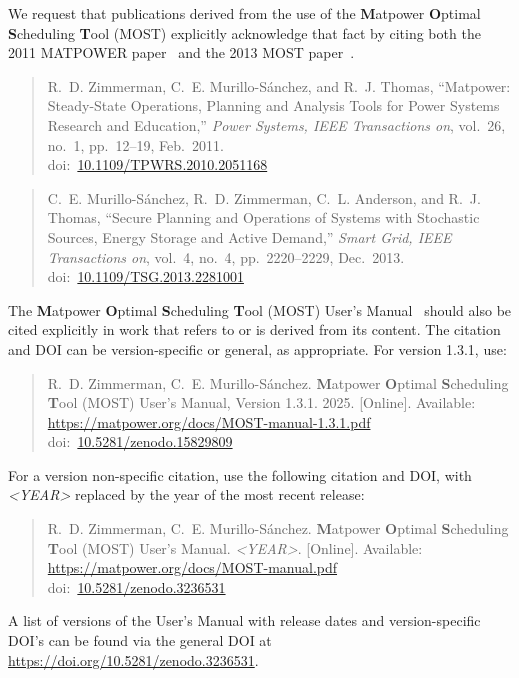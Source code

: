\documentclass[12pt]{article}
\newcommand{\matpower}[0]{{\sc Matpower}}
\newcommand{\most}[0]{{MOST}}
\newcommand{\mostname}[0]{{{\bf M}{\sc atpower} \textbf{O}ptimal \textbf{S}cheduling \textbf{T}ool}}
\newcommand{\doi}[1]{doi:~\href{https://doi.org/#1}{#1}}
\numberwithin{equation}{section}
\numberwithin{table}{section}
\numberwithin{figure}{section}
\begin{document}
We request that publications derived from the use of the \mostname{} (\most{}) explicitly acknowledge that fact by citing both the 2011 MATPOWER paper~\cite{zimmerman2011} and the 2013 MOST paper~\cite{murillo-sanchez2013a}.

\begin{quote}
\footnotesize
R.~D. Zimmerman, C.~E. Murillo-S{\'a}nchez, and R.~J. Thomas, ``\matpower{}: Steady-State Operations, Planning and Analysis Tools for Power Systems Research and Education,'' \emph{Power Systems, IEEE Transactions on}, vol.~26, no.~1, pp.~12--19, Feb.~2011.\\
\doi{10.1109/TPWRS.2010.2051168}
\end{quote}

\begin{quote}
\footnotesize
C.~E. Murillo-S{\'a}nchez, R.~D. Zimmerman, C.~L. Anderson, and R.~J. Thomas, ``Secure Planning and Operations of Systems with Stochastic Sources, Energy Storage and Active Demand,'' \emph{Smart Grid, IEEE Transactions on}, vol.~4, no.~4, pp.~2220--2229, Dec.~2013.\\
\doi{10.1109/TSG.2013.2281001}
\end{quote}

The \mostname{} (\most) User's Manual~\cite{most_manual} should also be
cited explicitly in work that refers to or is derived from its content.
The citation and DOI can be version-specific or general, as appropriate.
For version 1.3.1, use:

\begin{quote}
\footnotesize
R.~D. Zimmerman, C.~E. Murillo-S{\'a}nchez. \mostname{} (\most{}) User's Manual, Version 1.3.1. 2025. [Online]. Available: \url{https://matpower.org/docs/MOST-manual-1.3.1.pdf}\\
\doi{10.5281/zenodo.15829809}
\end{quote}
For a version non-specific citation, use the following citation and DOI,
with \emph{\textless{}YEAR\textgreater{}} replaced by the year of the most recent release:

\begin{quote}
\footnotesize
R.~D. Zimmerman, C.~E. Murillo-S{\'a}nchez. \mostname{} (\most{}) User's Manual. \emph{\textless{}YEAR\textgreater{}}.
[Online]. Available: \url{https://matpower.org/docs/MOST-manual.pdf}\\
\doi{10.5281/zenodo.3236531}
\end{quote}
A list of versions of the User's Manual with release dates and
version-specific DOI's can be found via the general DOI at
\url{https://doi.org/10.5281/zenodo.3236531}.
\end{document}
